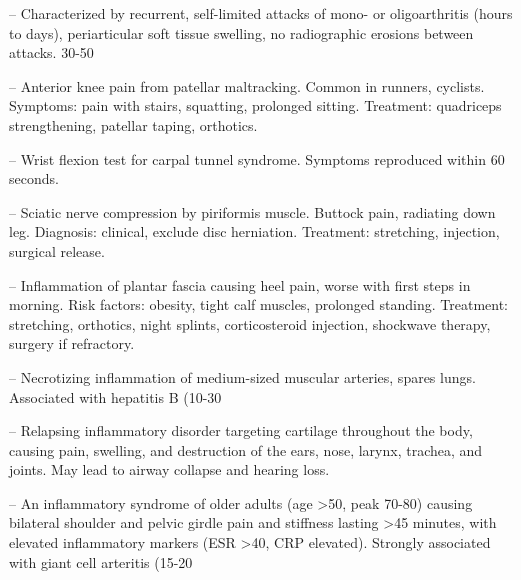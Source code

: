 -- Characterized by recurrent, self-limited attacks of mono- or oligoarthritis (hours to days), periarticular soft tissue swelling, no radiographic erosions between attacks. 30-50%

-- Anterior knee pain from patellar maltracking. Common in runners, cyclists. Symptoms: pain with stairs, squatting, prolonged sitting. Treatment: quadriceps strengthening, patellar taping, orthotics.

-- Wrist flexion test for carpal tunnel syndrome. Symptoms reproduced within 60 seconds.

-- Sciatic nerve compression by piriformis muscle. Buttock pain, radiating down leg. Diagnosis: clinical, exclude disc herniation. Treatment: stretching, injection, surgical release.

-- Inflammation of plantar fascia causing heel pain, worse with first steps in morning. Risk factors: obesity, tight calf muscles, prolonged standing. Treatment: stretching, orthotics, night splints, corticosteroid injection, shockwave therapy, surgery if refractory.

-- Necrotizing inflammation of medium-sized muscular arteries, spares lungs. Associated with hepatitis B (10-30%

-- Relapsing inflammatory disorder targeting cartilage throughout the body, causing pain, swelling, and destruction of the ears, nose, larynx, trachea, and joints. May lead to airway collapse and hearing loss.

-- An inflammatory syndrome of older adults (age >50, peak 70-80) causing bilateral shoulder and pelvic girdle pain and stiffness lasting >45 minutes, with elevated inflammatory markers (ESR >40, CRP elevated). Strongly associated with giant cell arteritis (15-20%

